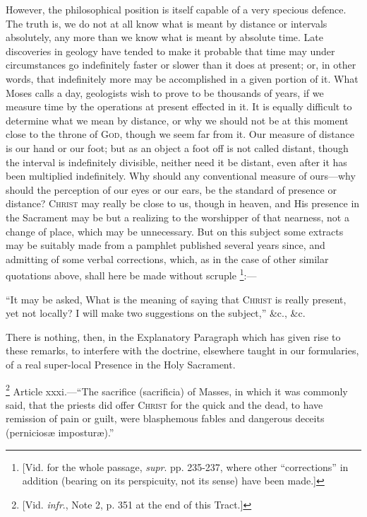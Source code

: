 However, the philosophical position is itself capable of a very
specious defence. The truth is, we do not at all know what is meant by
distance or intervals absolutely, any more than we know what is meant
by absolute time. Late discoveries in geology have tended to make it
probable that time may under circumstances go indefinitely faster or
slower than it does at present; or, in other words, that indefinitely
more may be accomplished in a given portion of it. What Moses calls a
day, geologists wish to prove to be thousands of years, if we measure
time by the operations at present effected in it. It is equally
difficult to determine what we mean by distance, or why we should not
be at this moment close to the throne of G\textsc{od},
though we seem far from it. Our measure of distance is our hand or our
foot; but as an object a foot off is not called distant, though the
interval is indefinitely divisible, neither need it be distant, even
after it has been multiplied indefinitely. Why should any conventional
measure of ours—why should the perception of our eyes or our ears,
be the standard of presence or distance? C\textsc{hrist}
may really be close to us, though in heaven, and His presence in
the Sacrament may be but a realizing to the worshipper of that
nearness, not a change of place, which may be unnecessary. But on this
subject some extracts may be suitably made from a pamphlet published
several years since, and admitting of some verbal corrections, which,
as in the case of other similar quotations above, shall here be made
without scruple \footnote{[Vid. for the whole passage, \emph{supr}.
pp. 235-237, where other ``corrections'' in addition (bearing
on its perspicuity, not its sense) have been made.]}:—

``It may be asked, What is the meaning of saying that C\textsc{hrist}
is really present, yet not locally? I will make two suggestions on the
subject,'' \&c., \&c.

There is nothing, then, in the Explanatory Paragraph which has
given rise to these remarks, to interfere with the doctrine, elsewhere
taught in our formularies, of a real super-local Presence in the Holy
Sacrament.


\footnote{[Vid. \emph{infr}., Note
2, p. 351 at the end of this Tract.]} Article xxxi.—``The
sacrifice (sacrificia) of Masses, in which it was commonly said, that
the priests did offer C\textsc{hrist} for the quick and
the dead, to have remission of pain or guilt, were blasphemous fables
and dangerous deceits (perniciosæ imposturæ).''

